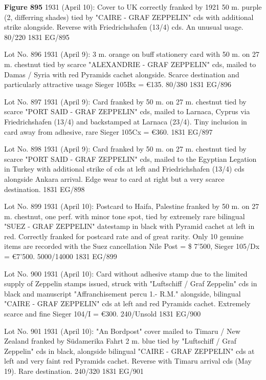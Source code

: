 \documentclass[justified]{tufte-book}
\begin{document}
%
{\textbf{Figure 895} 1931 (April 10): Cover to UK correctly franked by 1921 50 m. purple (2, differring shades) tied by "CAIRE - GRAF ZEPPELIN" cds with additional strike alongside. Reverse with Friedrichshafen (13/4) cds. An unusual usage. 80/220}%
{1831}%
{EG/895}%
{}%
{}
{}%
{}

%
{Lot No. 896
1931 (April 9): 3 m. orange on buff stationery card with 50 m. on 27 m. chestnut tied by scarce "ALEXANDRIE - GRAF ZEPPELIN" cds, mailed to Damas / Syria with red Pyramids cachet alongside. Scarce destination and particularly attractive usage Sieger 105Bx = \euro 135. 80/380}%
{1831}%
{EG/896}%
{}%
{}
{}%
{}


%
{Lot No. 897
1931 (April 9): Card franked by 50 m. on 27 m. chestnut tied by scarce "PORT SAID - GRAF ZEPPELIN" cds, mailed to Larnaca, Cyprus via Friedrichshafen (13/4) and backstamped at Larnaca (23/4). Tiny inclusion in card away from adhesive, rare Sieger 105Cx = \euro 360.}%
{1831}%
{EG/897}%
{}%
{}
{}%
{}

%
{Lot No. 898
1931 (April 9): Card franked by 50 m. on 27 m. chestnut tied by scarce "PORT SAID - GRAF ZEPPELIN" cds, mailed to the Egyptian Legation in Turkey with additional strike of cds at left and Friedrichshafen (13/4) cds alongside Ankara arrival. Edge wear to card at right but a very scarce destination.}%
{1831}%
{EG/898}%
{}%
{}
{}%
{}

%
{Lot No. 899
1931 (April 10): Postcard to Haifa, Palestine franked by 50 m. on 27 m. chestnut, one perf. with minor tone spot, tied by extremely rare bilingual "SUEZ - GRAF ZEPPELIN" datestamp in black with Pyramid cachet at left in red. Correctly franked for postcard rate and of great rarity. Only 10 genuine items are recorded with the Suez cancellation Nile Post = \$ 7'500, Sieger 105/Dx = \euro 7'500. 5000/14000}%
{1831}%
{EG/899}%
{}%
{}
{}%
{}

%
{Lot No. 900
1931 (April 10): Card without adhesive stamp due to the limited supply of Zeppelin stamps issued, struck with "Luftschiff / Graf Zeppelin" cds in black and manuscript "Affranchisement percu 1.- R.M." alongside, bilingual "CAIRE - GRAF ZEPPELIN" cds at left and red Pyramids cachet. Extremely scarce and fine Sieger 104/I = \euro 300. 240/Unsold}%
{1831}%
{EG/900}%
{}%
{}
{}%
{}


%
{Lot No. 901
1931 (April 10): "An Bordpost" cover mailed to Timaru / New Zealand franked by Südamerika Fahrt 2 m. blue tied by "Luftschiff / Graf Zeppelin" cds in black, alongside bilingual "CAIRE - GRAF ZEPPELIN" cds at left and very faint red Pyramids cachet. Reverse with Timaru arrival cds (May 19). Rare destination. 240/320}%
{1831}%
{EG/901}%
{}%
{}
{}%
{}
\end{document}
